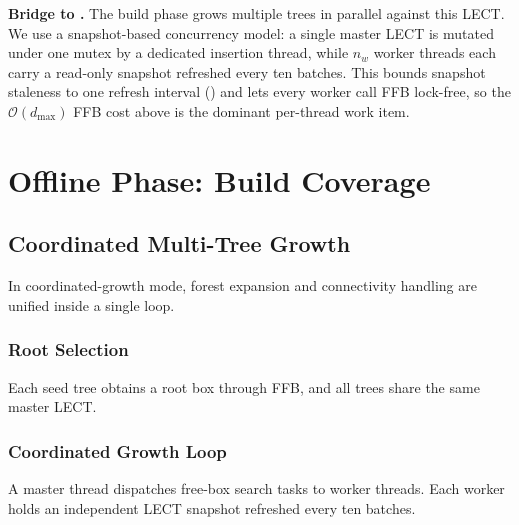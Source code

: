 \documentclass[journal]{IEEEtran}
\begin{document}
\textbf{Bridge to .}
The build phase grows multiple trees in parallel against this LECT.
We use a snapshot-based concurrency model: a single master LECT is
mutated under one mutex by a dedicated insertion thread, while
$n_w$ worker threads each carry a read-only snapshot refreshed every
ten batches. This bounds snapshot staleness to one refresh interval
() and lets every worker call FFB lock-free, so the
$\mathcal{O}(d_{\max})$ FFB cost above is the dominant per-thread
work item.

\section{Offline Phase: Build Coverage}\label{sec:build}

\subsection{Coordinated Multi-Tree Growth}

In coordinated-growth mode, forest expansion and connectivity handling
are unified inside a single loop.

\subsubsection{Root Selection}
Each seed tree obtains a root box through FFB, and all trees share the
same master LECT.

\subsubsection{Coordinated Growth Loop}
A master thread dispatches free-box search tasks to worker threads.
Each worker holds an independent LECT snapshot refreshed every ten
batches.
\end{document}
